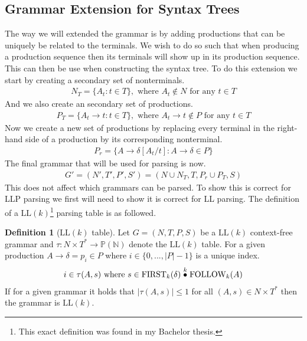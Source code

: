 \documentclass[a4paper,12pt]{article}
\newcommand{\truncprod}[1]{\stackrel{\mathclap{#1}}{\bullet}}
\newcommand\LL{\text{LL}}
\newcommand\FIRST{\text{FIRST}}
\newcommand\FOLLOW{\text{FOLLOW}}
\theoremstyle{definition}
\newtheorem{definition}{Definition}[section]
\begin{document}
\subsection{Grammar Extension for Syntax Trees}
The way we will extended the grammar is by adding productions that can be uniquely be related to the terminals. We wish to do so such that when producing a production sequence then its terminals will show up in its production sequence. This can then be use when constructing the syntax tree. To do this extension we start by creating a secondary set of nonterminals.
\begin{align*}
  N_{T} = \{A_t : t \in T\}, \text{ where } A_t \notin N \text{ for any } t \in T
\end{align*}
And we also create an secondary set of productions.
\begin{align*}
  P_{T} = \{A_t \to t : t \in T\}, \text{ where } A_t \to t \notin P \text{ for any } t \in T
\end{align*}
Now we create a new set of productions by replacing every terminal in the right-hand side of a production by its corresponding nonterminal.
\begin{align*}
  P_r = \{A \to \delta[A_t/t] : A \to \delta \in P\}
\end{align*}
The final grammar that will be used for parsing is now.
\begin{align*}
  G' = (N', T', P', S') = (N \cup N_T, T, P_r \cup P_T, S)
\end{align*}
This does not affect which grammars can be parsed. To show this is correct for LLP parsing we first will need to show it is correct for LL parsing. The definition of a $\LL(k)$\footnote{This exact definition was found in my Bachelor thesis.} parsing table is as followed.
\begin{definition}[$\LL(k)$ table]
  Let $G = (N, T, P, S)$ be a $\LL(k)$ context-free grammar and $\tau : N \times T^* \to \mathbb{P}(\mathbb{N})$ denote the $\LL(k)$ table. For a given production $A \to \delta = p_i \in P$ where $i \in \{0, ..., |P| - 1\}$ is a unique index.
  \begin{gather*}
      i \in \tau(A, s) \text{ where } s \in \FIRST_k(\delta) \truncprod{k} \FOLLOW_k(A)
  \end{gather*}
  If for a given grammar it holds that $|\tau(A, s)| \leq 1$ for all $(A, s) \in N \times T^*$ then the grammar is $\LL(k)$.
\end{definition}
\end{document}
